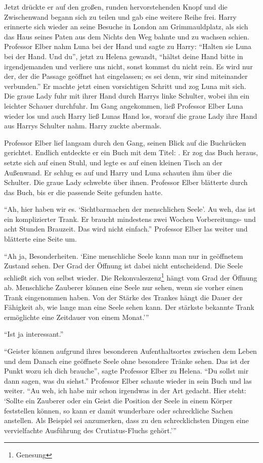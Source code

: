 Jetzt drückte er auf den großen, runden hervorstehenden Knopf und die Zwischenwand begann sich zu teilen und gab eine weitere Reihe frei. Harry erinnerte sich wieder an seine Besuche in London am Grimmauldplatz, als sich das Haus seines Paten aus dem Nichts den Weg bahnte und zu wachsen schien. Professor Elber nahm Luna bei der Hand und sagte zu Harry: \enquote{Halten sie Luna bei der Hand. Und du}, jetzt zu Helena gewandt, \enquote{hältst deine Hand bitte in irgendjemanden und verliere uns nicht, sonst kommst du nicht rein. Es wird nur der, der die Passage geöffnet hat eingelassen; es sei denn, wir sind miteinander verbunden.} Er machte jetzt einen vorsichtigen Schritt und zog Luna mit sich. Die graue Lady fuhr mit ihrer Hand durch Harrys linke Schulter, wobei ihn ein leichter Schauer durchfuhr. Im Gang angekommen, ließ Professor Elber Luna wieder los und auch Harry ließ Lunas Hand los, worauf die graue Lady ihre Hand aus Harrys Schulter nahm. Harry zuckte abermals.

Professor Elber lief langsam durch den Gang, seinen Blick auf die Buchrücken gerichtet. Endlich entdeckte er ein Buch mit dem Titel: . Er zog das Buch heraus, setzte sich auf einen Stuhl, und legte es auf einen kleinen Tisch an der Außenwand. Er schlug es auf und Harry und Luna schauten ihm über die Schulter. Die graue Lady schwebte über ihnen. Professor Elber blätterte durch das Buch, bis er die passende Seite gefunden hatte.

\enquote{Ah, hier haben wir es. \enquote{Sichtbarmachen der menschlichen Seele}. Au weh, das ist ein komplizierter Trank. Er braucht mindestens zwei Wochen Vorbereitungs- und acht Stunden Brauzeit. Das wird nicht einfach.} Professor Elber las weiter und blätterte eine Seite um.

\enquote{Ah ja, Besonderheiten. \enquote{Eine menschliche Seele kann man nur in geöffnetem Zustand sehen. Der Grad der Öffnung ist dabei nicht entscheidend. Die Seele schließt sich von selbst wieder. Die Rekonvaleszenz\footnote{Genesung} hängt vom Grad der Öffnung ab. Menschliche Zauberer können eine Seele nur sehen, wenn sie vorher einen  Trank eingenommen haben. Von der Stärke des Trankes hängt die Dauer der Fähigkeit ab, wie lange man eine Seele sehen kann. Der stärkste bekannte Trank ermöglichte eine Zeitdauer von einem Monat.}}

\enquote{Ist ja interessant.}

\enquote{Geister können aufgrund ihres besonderen Aufenthaltsortes zwischen dem Leben und dem Danach eine geöffnete Seele ohne besondere Tränke sehen. \gst Das ist der Punkt wozu ich dich brauche}, sagte Professor Elber zu Helena. \enquote{Du sollst mir dann sagen, was du siehst.} Professor Elber schaute wieder in sein Buch und las weiter. \enquote{Au weh, ich habe mir schon irgendwas in der Art gedacht. Hier steht: \enquote{Sollte ein Zauberer oder ein Geist die Position der Seele in einem Körper feststellen können, so kann er damit wunderbare oder schreckliche Sachen anstellen. Als Beispiel sei anzumerken, dass zu den schrecklichsten Dingen eine vervielfachte Ausführung des Crutiatus-Fluchs gehört.}}

